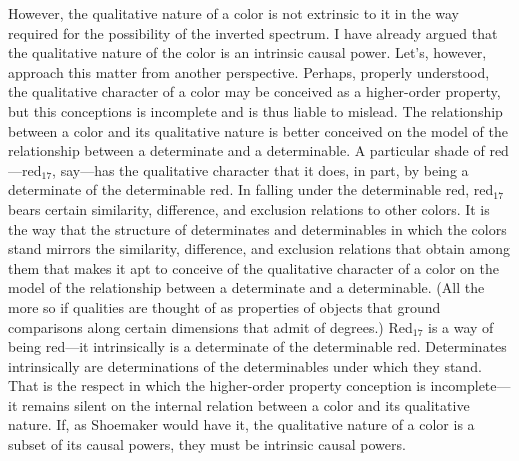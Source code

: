 \documentclass[12pt]{article}
\begin{document}
However, the qualitative nature of a color is not extrinsic to it in the way required for the possibility of the inverted spectrum. I have already argued that the qualitative nature of the color is an intrinsic causal power. Let's, however, approach this matter from another perspective. Perhaps, properly understood, the qualitative character of a color may be conceived as a higher-order property, but this conceptions is incomplete and is thus liable to mislead. The relationship between a color and its qualitative nature is better conceived on the model of the relationship between a determinate and a determinable. A particular shade of red---red$_{17}$, say---has the qualitative character that it does, in part, by being a determinate of the determinable red. In falling under the determinable red, red$_{17}$ bears certain similarity, difference, and exclusion relations to other colors. It is the way that the structure of determinates and determinables in which the colors stand mirrors the similarity, difference, and exclusion relations that obtain among them that makes it apt to conceive of the qualitative character of a color on the model of the relationship between a determinate and a determinable. (All the more so if qualities are thought of as properties of objects that ground comparisons along certain dimensions that admit of degrees.) Red$_{17}$ is a way of being red---it intrinsically is a determinate of the determinable red. Determinates intrinsically are determinations of the determinables under which they stand. That is the respect in which the higher-order property conception is incomplete---it remains silent on the internal relation between a color and its qualitative nature. If, as Shoemaker would have it, the qualitative nature of a color is a subset of its causal powers, they must be intrinsic causal powers. 
\end{document}
